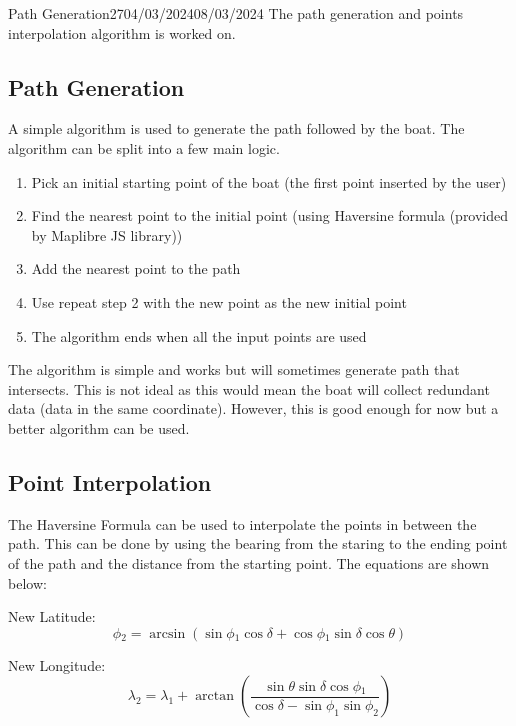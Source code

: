 \documentclass[12pt]{article}
\begin{document}
\begin{logbook-entry}{Path Generation}{27}{04/03/2024}{08/03/2024}
The path generation and points interpolation algorithm is worked on.

\subsection*{Path Generation}
A simple algorithm is used to generate the path followed by the boat.
The algorithm can be split into a few main logic.

\begin{enumerate}
    \item Pick an initial starting point of the boat (the first point inserted by the user)
    \item Find the nearest point to the initial point (using Haversine formula (provided by Maplibre JS library))
    \item Add the nearest point to the path
    \item Use repeat step 2 with the new point as the new initial point
    \item The algorithm ends when all the input points are used
\end{enumerate}

The algorithm is simple and works but will sometimes generate path that intersects.
This is not ideal as this would mean the boat will collect redundant data (data in the same coordinate).
However, this is good enough for now but a better algorithm can be used.

\subsection*{Point Interpolation}
The Haversine Formula can be used to interpolate the points in between the path.
This can be done by using the bearing from the staring to the ending point of the path and the distance from the starting point.
The equations are shown below:

New Latitude:
\begin{equation}
    \phi{}_{2} = \arcsin{(\sin{\phi{}_{1}} \cos{\delta} + \cos{\phi{}_{1}} \sin{\delta} \cos{\theta})}
\end{equation}

New Longitude:
\begin{equation}
    \lambda{}_{2} = \lambda{}_{1} + \arctan{(\frac{\sin{\theta} \sin{\delta} \cos{\phi{}_{1}}}{\cos{\delta} - \sin{\phi_{1} \sin{\phi_{2}}}})}
\end{equation}


\end{logbook-entry}
\end{document}
